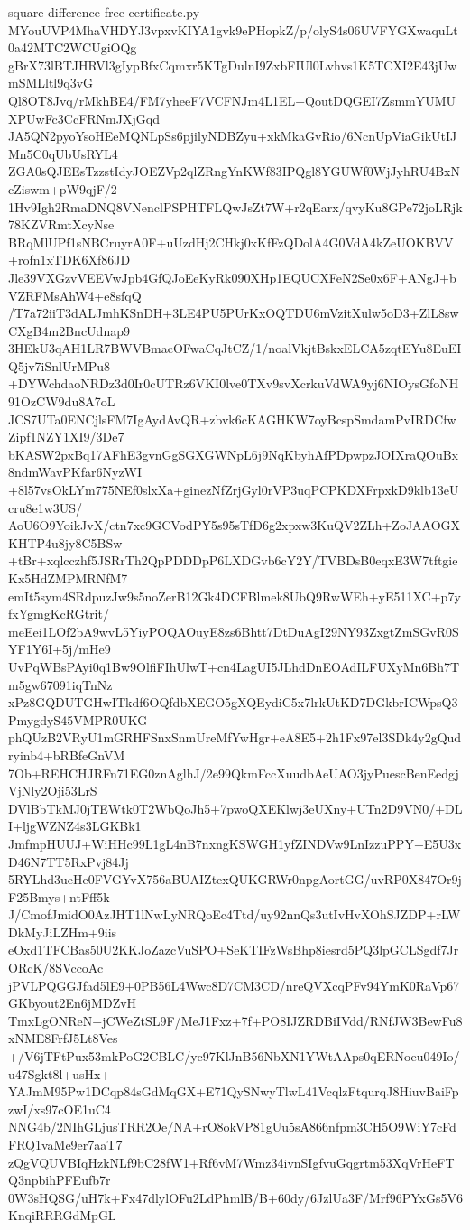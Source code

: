 \documentclass[11pt]{article}
\theoremstyle{definition}
\theoremstyle{remark}
\begin{document}
\begin{filecontents*}[overwrite]{square-difference-free-certificate.py}
MYouUVP4MhaVHDYJ3vpxvKIYA1gvk9ePHopkZ/p/olyS4s06UVFYGXwaquLt0a42MTC2WCUgiOQg
gBrX73lBTJHRVl3gIypBfxCqmxr5KTgDulnI9ZxbFIUl0Lvhvs1K5TCXI2E43jUwmSMLltl9q3vG
Ql8OT8Jvq/rMkhBE4/FM7yheeF7VCFNJm4L1EL+QoutDQGEI7ZsmmYUMUXPUwFc3CcFRNmJXjGqd
JA5QN2pyoYsoHEeMQNLpSs6pjilyNDBZyu+xkMkaGvRio/6NcnUpViaGikUtIJMn5C0qUbUsRYL4
ZGA0sQJEEsTzzstIdyJOEZVp2qlZRngYnKWf83IPQgl8YGUWf0WjJyhRU4BxNcZiswm+pW9qjF/2
1Hv9Igh2RmaDNQ8VNenclPSPHTFLQwJsZt7W+r2qEarx/qvyKu8GPe72joLRjk78KZVRmtXcyNse
BRqMlUPf1sNBCruyrA0F+uUzdHj2CHkj0xKfFzQDolA4G0VdA4kZeUOKBVV+rofn1xTDK6Xf86JD
Jle39VXGzvVEEVwJpb4GfQJoEeKyRk090XHp1EQUCXFeN2Se0x6F+ANgJ+bVZRFMsAhW4+e8sfqQ
/T7a72iiT3dALJmhKSnDH+3LE4PU5PUrKxOQTDU6mVzitXulw5oD3+ZlL8swCXgB4m2BncUdnap9
3HEkU3qAH1LR7BWVBmacOFwaCqJtCZ/1/noalVkjtBskxELCA5zqtEYu8EuEIQ5jv7iSnlUrMPu8
+DYWchdaoNRDz3d0Ir0cUTRz6VKI0lve0TXv9svXcrkuVdWA9yj6NIOysGfoNH91OzCW9du8A7oL
JCS7UTa0ENCjlsFM7IgAydAvQR+zbvk6cKAGHKW7oyBcspSmdamPvIRDCfwZipf1NZY1XI9/3De7
bKASW2pxBq17AFhE3gvnGgSGXGWNpL6j9NqKbyhAfPDpwpzJOIXraQOuBx8ndmWavPKfar6NyzWI
+8l57vsOkLYm775NEf0slxXa+ginezNfZrjGyl0rVP3uqPCPKDXFrpxkD9klb13eUcru8e1w3US/
AoU6O9YoikJvX/ctn7xc9GCVodPY5s95sTfD6g2xpxw3KuQV2ZLh+ZoJAAOGXKHTP4u8jy8C5BSw
+tBr+xqlcczhf5JSRrTh2QpPDDDpP6LXDGvb6cY2Y/TVBDsB0eqxE3W7tftgieKx5HdZMPMRNfM7
emIt5sym4SRdpuzJw9s5noZerB12Gk4DCFBlmek8UbQ9RwWEh+yE511XC+p7yfxYgmgKcRGtrit/
meEei1LOf2bA9wvL5YiyPOQAOuyE8zs6Bhtt7DtDuAgI29NY93ZxgtZmSGvR0SYF1Y6I+5j/mHe9
UvPqWBsPAyi0q1Bw9OlfiFIhUlwT+cn4LagUI5JLhdDnEOAdILFUXyMn6Bh7Tm5gw67091iqTnNz
xPz8GQDUTGHwITkdf6OQfdbXEGO5gXQEydiC5x7lrkUtKD7DGkbrICWpsQ3PmygdyS45VMPR0UKG
phQUzB2VRyU1mGRHFSnxSnmUreMfYwHgr+eA8E5+2h1Fx97el3SDk4y2gQudryinb4+bRBfeGnVM
7Ob+REHCHJRFn71EG0znAglhJ/2e99QkmFccXuudbAeUAO3jyPuescBenEedgjVjNly2Oji53LrS
DVlBbTkMJ0jTEWtk0T2WbQoJh5+7pwoQXEKlwj3eUXny+UTn2D9VN0/+DLI+ljgWZNZ4s3LGKBk1
JmfmpHUUJ+WiHHc99L1gL4nB7nxngKSWGH1yfZINDVw9LnIzzuPPY+E5U3xD46N7TT5RxPvj84Jj
5RYLhd3ueHe0FVGYvX756aBUAIZtexQUKGRWr0npgAortGG/uvRP0X847Or9jF25Bmys+ntFff5k
J/CmofJmidO0AzJHT1lNwLyNRQoEc4Ttd/uy92nnQs3utIvHvXOhSJZDP+rLWDkMyJiLZHm+9iis
eOxd1TFCBas50U2KKJoZazcVuSPO+SeKTIFzWsBhp8iesrd5PQ3lpGCLSgdf7JrORcK/8SVccoAc
jPVLPQGGJfad5lE9+0PB56L4Wwc8D7CM3CD/nreQVXcqPFv94YmK0RaVp67GKbyout2En6jMDZvH
TmxLgONReN+jCWeZtSL9F/MeJ1Fxz+7f+PO8IJZRDBiIVdd/RNfJW3BewFu8xNME8FrfJ5Lt8Ves
+/V6jTFtPux53mkPoG2CBLC/yc97KlJnB56NbXN1YWtAAps0qERNoeu049Io/u47Sgkt8l+usHx+
YAJmM95Pw1DCqp84sGdMqGX+E71QySNwyTlwL41VcqlzFtqurqJ8HiuvBaiFpzwI/xs97cOE1uC4
NNG4b/2NIhGLjusTRR2Oe/NA+rO8okVP81gUu5sA866nfpm3CH5O9WiY7cFdFRQ1vaMe9er7aaT7
zQgVQUVBIqHzkNLf9bC28fW1+Rf6vM7Wmz34ivnSIgfvuGqgrtm53XqVrHeFTQ3npbihPFEufb7r
0W3sHQSG/uH7k+Fx47dlylOFu2LdPhmlB/B+60dy/6JzlUa3F/Mrf96PYxGs5V6KnqiRRRGdMpGL

\end{filecontents*}
\end{document}
